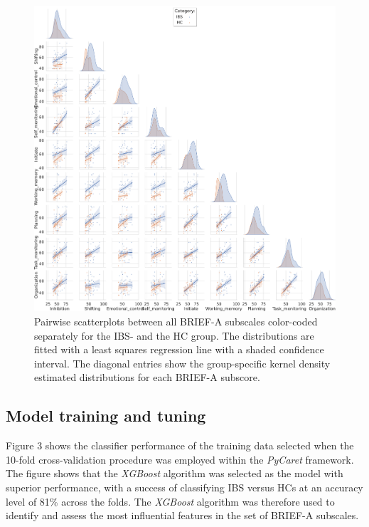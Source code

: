 \documentclass[jcm,article,submit,pdftex,moreauthors]{Definitions/mdpi}
\begin{document}
\begin{figure}[H]
\includegraphics[width=14.5cm]{Figs/BRIEF_items_sns_pairplot.pdf}
\caption{Pairwise scatterplots between all BRIEF-A subscales color-coded separately for the IBS- and the HC group. The distributions are fitted with a least squares regression line with a shaded confidence interval. The diagonal entries show the group-specific kernel density estimated distributions for each BRIEF-A subscore.}
\end{figure}  




\subsection{Model training and tuning}

Figure 3 shows the classifier performance of the training data selected when the 10-fold cross-validation procedure was employed within the \textit{PyCaret} framework. 
The figure shows that the \textit{XGBoost} algorithm was selected as the model with superior performance, with a success of classifying IBS versus HCs at an accuracy level of 81\% across the folds. The \textit{XGBoost} algorithm was therefore used to identify and assess the most influential features in the set of BRIEF-A subscales.
\end{document}
